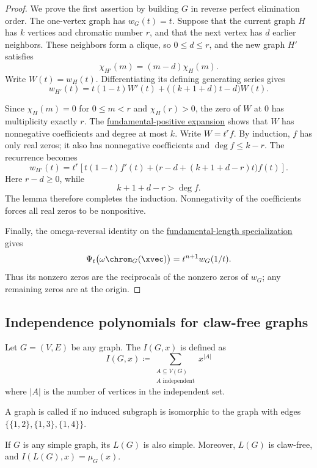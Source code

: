\begin{proof}
We prove the first assertion by building $G$ in reverse perfect elimination
order.  The one-vertex graph has $w_G(t)=t$.  Suppose that the current graph
$H$ has $k$ vertices and chromatic number $r$, and that the next vertex has
$d$ earlier neighbors.  These neighbors form a clique, so $0\leq d\leq r$,
and the new graph $H'$ satisfies
\[
 \chi_{H'}(m)=(m-d)\chi_H(m).
\]
Write $W(t)=w_H(t)$.  Differentiating its defining generating series gives
\[
 w_{H'}(t)
 =t(1-t)W'(t)+\bigl((k+1+d)t-d\bigr)W(t).
\]

Since $\chi_H(m)=0$ for $0\leq m<r$ and $\chi_H(r)>0$, the zero of $W$ at
$0$ has multiplicity exactly $r$.  The
\hyperref[chromaticQuasisymmetricGesselExpansion]{fundamental-positive
expansion} shows that $W$ has nonnegative coefficients and degree at most
$k$.  Write $W=t^rf$.  By induction, $f$ has only real zeros; it also has
nonnegative coefficients and $\deg f\leq k-r$.  The recurrence becomes
\[
 w_{H'}(t)
 =t^r\left[
 t(1-t)f'(t)
 +\bigl(r-d+(k+1+d-r)t\bigr)f(t)
 \right].
\]
Here $r-d\geq0$, while
\[
 k+1+d-r>\deg f.
\]
The lemma therefore completes the induction.  Nonnegativity of the
coefficients forces all real zeros to be nonpositive.

Finally, the omega-reversal identity on the
\hyperref[gesselLengthSpecialization]{fundamental-length specialization}
gives
\[
 \Psi_t\bigl(\omega\chrom_G(\xvec)\bigr)
 =t^{n+1}w_G(1/t).
\]
Thus its nonzero zeros are the reciprocals of the nonzero zeros of $w_G$;
any remaining zeros are at the origin.
\end{proof}




\subsection[realRootedIndependence]{Independence polynomials for claw-free graphs}

Let $G = (V,E)$ be any graph.
The \label{independencePolynomial} $I(G,x)$ is
defined as
\[
I(G,x) \coloneqq \sum_{\substack{A \subseteq V(G) \\ \text{$A$ independent}}} x^{|A|}
\]
where $|A|$ is the number of vertices in the independent set.

A graph is called \label{clawFreeGraph} if no induced
subgraph is isomorphic
to the graph with edges $\{\{1,2\},\{1,3\},\{1,4\}\}$.

If $G$ is any simple graph, its \label{lineGraph} $L(G)$ is
also simple.
Moreover, $L(G)$ is claw-free, and $I(L(G),x) = \mu_G(x)$.

